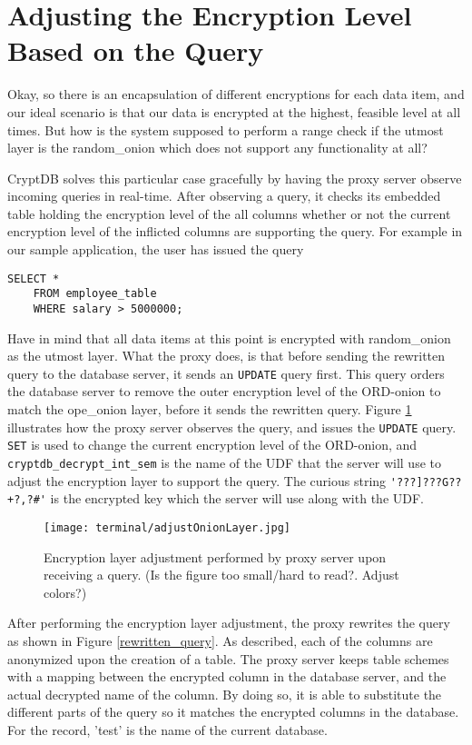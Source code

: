 \section{Adjusting the Encryption Level Based on the Query}
\label{adjust_enc_level}

Okay, so there is an encapsulation of different encryptions for each data item, and our ideal scenario is that our data is encrypted at the highest, feasible level at all times.  But how is the system supposed to perform a range check if the utmost layer is the \gls{random_onion} which does not support any functionality at all?

CryptDB solves this particular case gracefully by having the proxy server observe incoming queries in real-time. After observing a query, it checks its embedded table holding the encryption level of the all columns whether or not the current encryption level of the inflicted columns are supporting the query. For example in our sample application, the user has issued the query 
\begin{verbatim}
SELECT *
	FROM employee_table
	WHERE salary > 5000000;
\end{verbatim}

Have in mind that all data items at this point is encrypted with \gls{random_onion} as the utmost layer. What the proxy does, is that before sending the rewritten query to the database server, it sends an \verb!UPDATE! query first. This query orders the database server to remove the outer encryption level of the ORD-onion to match the \gls{ope_onion} layer, before it sends the rewritten query. Figure \ref{ope_layer_adjustment} illustrates how the proxy server observes the query, and issues the \verb!UPDATE! query. \verb!SET! is used to change the current encryption level of the ORD-onion, and \verb!cryptdb_decrypt_int_sem! is the name of the UDF that the server will use to adjust the encryption layer to  support the query. The curious string \verb!'???]???G??+?,?#'! is the encrypted key which the server will use along with the UDF.

\begin{figure}[h]
	\texttt{[image: terminal/adjustOnionLayer.jpg]}
	\caption{Encryption layer adjustment performed by proxy server upon receiving a query. (Is the figure too small/hard to read?. Adjust colors?)}
	\label{ope_layer_adjustment}
\end{figure}

After performing the encryption layer adjustment, the proxy rewrites the query as shown in Figure \ref{rewritten_query}. As described, each of the columns are anonymized upon the creation of a table. The proxy server keeps table schemes with a mapping between the encrypted column in the database server, and the actual decrypted name of the column. By doing so, it is able to substitute the different parts of the query so it matches the encrypted columns in the database. For the record, 'test' is the name of the current database.  

